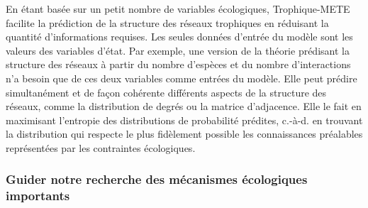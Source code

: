 En étant basée sur un petit nombre de variables écologiques, Trophique-METE
facilite la prédiction de la structure des réseaux trophiques en réduisant la
quantité d'informations requises. Les seules données d'entrée du modèle sont les
valeurs des variables d'état. Par exemple, une version de la théorie prédisant
la structure des réseaux à partir du nombre d'espèces et du nombre
d'interactions n'a besoin que de ces deux variables comme entrées du modèle.
Elle peut prédire simultanément et de façon cohérente différents aspects de la
structure des réseaux, comme la distribution de degrés ou la matrice
d'adjacence. Elle le fait en maximisant l'entropie des distributions de
probabilité prédites, c.-à-d. en trouvant la distribution qui respecte le
plus fidèlement possible les connaissances préalables représentées par les
contraintes écologiques. 

\subsubsection{Guider notre recherche des mécanismes écologiques importants} 


